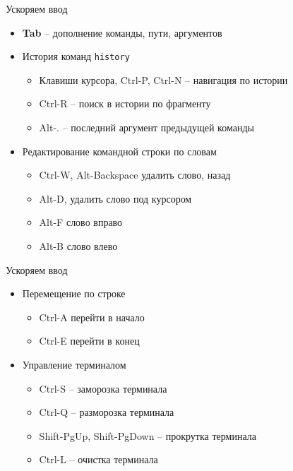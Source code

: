 \begin{frame}{Ускоряем ввод}
  \begin{itemize}
    \item \textbf{Tab} -- дополнение команды, пути, аргументов
      \pause
    \item История команд \alert{{\tt history}}
      \begin{itemize}
        \item Клавиши курсора, \alert{Ctrl-P}, \alert{Ctrl-N} -- навигация по истории
        \item \alert{Ctrl-R} -- поиск в истории по фрагменту
        \item \alert{Alt-.}  -- последний аргумент предыдущей команды
      \end{itemize}
      \pause
    \item Редактирование командной строки по словам
      \begin{itemize}
        \item \alert{Ctrl-W}, \alert{Alt-Backspace} удалить слово, назад
        \item \alert{Alt-D}, удалить слово под курсором 
        \item \alert{Alt-F} слово вправо
        \item \alert{Alt-B} слово влево
      \end{itemize}
      \pause
  \end{itemize}
\end{frame}

\begin{frame}{Ускоряем ввод}
  \begin{itemize}
    \item Перемещение по строке
      \begin{itemize}
        \item \alert{Ctrl-A} перейти в начало 
        \item \alert{Ctrl-E} перейти в конец
      \end{itemize}
      \pause
    \item Управление терминалом
      \begin{itemize}
        \item Ctrl-S -- заморозка терминала
        \item Ctrl-Q -- разморозка терминала
        \item \alert{Shift-PgUp}, \alert{Shift-PgDown} -- прокрутка терминала
        \item \alert{Ctrl-L} -- очистка терминала
      \end{itemize}
  \end{itemize}
\end{frame}


